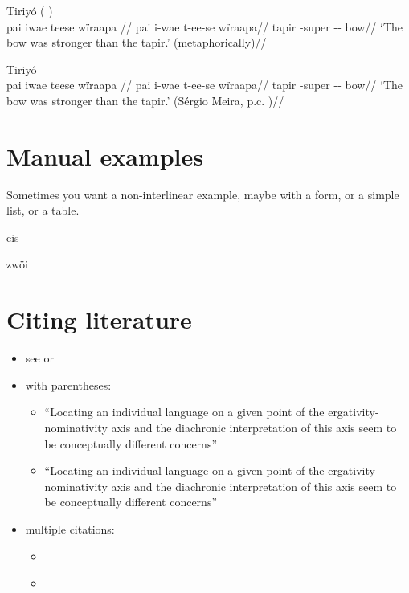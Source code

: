 \documentclass{article}
\begin{document}
\ex  Tiriyó (\cite[420]{triomeira1999}
) \\\label{tri-1}
\begingl \glpreamble pai iwae teese wïraapa //
\gla pai i-wae t-ee-se wïraapa//
\glb tapir -super -- bow//
\glft ‘The bow was stronger than the tapir.’ (metaphorically)//
\endgl
\xe

\ex  Tiriyó  \\\label{tri-1}
\begingl \glpreamble pai iwae teese wïraapa //
\gla pai i-wae t-ee-se wïraapa//
\glb tapir -super -- bow//
\glft ‘The bow was stronger than the tapir.’ (Sérgio Meira, p.c.
)//
\endgl
\xe

\section{\texorpdfstring{Manual
examples\label{manual-examples}}{Manual examples}}

Sometimes you want a non-interlinear example, maybe with a form, or a
simple list, or a table.

\ex\label{manex1} eis \xe

\ex\label{manex2} zwöi \xe

\section{\texorpdfstring{Citing literature
\label{sec:sources}}{Citing literature }}

\begin{itemize}
\tightlist
\item
  see \textcites{alvarez1998split} or
  \textcites[133-134]{alvarez1998split}
\item
  with parentheses:

  \begin{itemize}
  \tightlist
  \item
    ``Locating an individual language on a given point of the
    ergativity-nominativity axis and the diachronic interpretation of
    this axis seem to be conceptually different concerns''
    \parencites{alvarez1998split}
  \item
    ``Locating an individual language on a given point of the
    ergativity-nominativity axis and the diachronic interpretation of
    this axis seem to be conceptually different concerns''
    \parencites[71]{alvarez1998split}
  \end{itemize}
\item
  multiple citations:

  \begin{itemize}
  \tightlist
  \item
    \textcites[133-134]{alvarez1998split}[218]{triomeira1999}
  \item
    \parencites[133-134]{alvarez1998split}[218]{triomeira1999}
  \end{itemize}
\end{itemize}

\printbibliography
\end{document}
